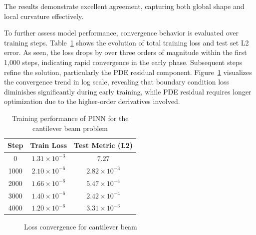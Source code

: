\documentclass[twocolumn]{svjour3}
\begin{document}
	The results demonstrate excellent agreement, capturing both global shape and local curvature effectively.
	
	To further assess model performance, convergence behavior is evaluated over training steps. Table~\ref{tab:cantilever_convergence} shows the evolution of total training loss and test set L2 error. As seen, the loss drops by over three orders of magnitude within the first 1,000 steps, indicating rapid convergence in the early phase. Subsequent steps refine the solution, particularly the PDE residual component. Figure~\ref{fig:cantilever_convergence} visualizes the convergence trend in log scale, revealing that boundary condition loss diminishes significantly during early training, while PDE residual requires longer optimization due to the higher-order derivatives involved.
	
	\begin{table}[htbp]
		\centering
		\caption{Training performance of PINN for the cantilever beam problem}
		\begin{tabular}{c c c}
			\toprule
			\textbf{Step} & \textbf{Train Loss} & \textbf{Test Metric (L2)} \\
			\midrule
			0 & $1.31 \times 10^{-3}$ & $7.27$ \\
			1000 & $2.10 \times 10^{-6}$ & $2.82 \times 10^{-3}$ \\
			2000 & $1.66 \times 10^{-6}$ & $5.47 \times 10^{-4}$ \\
			3000 & $1.40 \times 10^{-6}$ & $2.42 \times 10^{-4}$ \\
			4000 & $1.20 \times 10^{-6}$ & $3.31 \times 10^{-3}$ \\
			\bottomrule
		\end{tabular}\label{tab:cantilever_convergence}
	\end{table}
	
	\begin{figure}[htbp]
		\centering
		\caption{Loss convergence for cantilever beam}\label{fig:cantilever_convergence}
	\end{figure}
	
\end{document}
